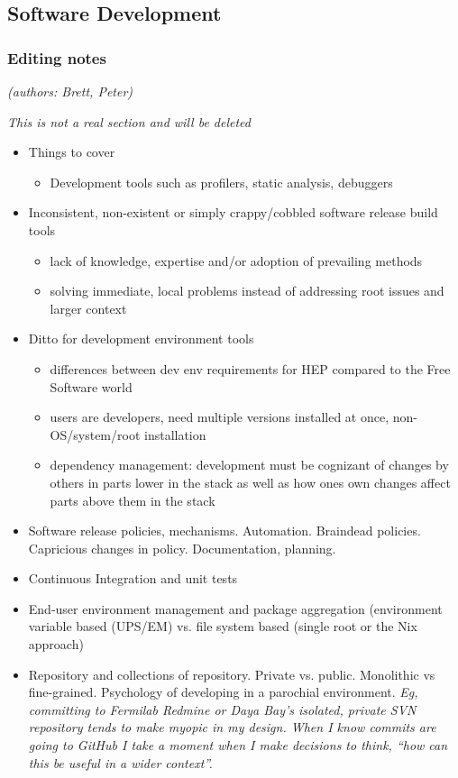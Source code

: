 \subsection{Software Development}

\subsubsection{Editing notes}

\textit{(authors: Brett, Peter)}

\textit{This is not a real section and will be deleted}

\begin{itemize}
\item Things to cover
  \begin{itemize}
  \item Development tools such as profilers, static analysis, debuggers
  \end{itemize}
\item Inconsistent, non-existent or simply crappy/cobbled software release build tools
  \begin{itemize}
  \item lack of knowledge, expertise and/or adoption of prevailing methods
  \item solving immediate, local problems instead of addressing root issues and larger context
  \end{itemize}
\item Ditto for development environment tools
  \begin{itemize}
  \item differences between dev env requirements for HEP compared to the Free Software world
  \item users are developers, need multiple versions installed at once, non-OS/system/root installation
  \item dependency management: development must be cognizant of changes by others in parts lower in the stack as well as how ones own changes affect parts above them in the stack
  \end{itemize}
\item Software release policies, mechanisms.  Automation.  Braindead policies.  Capricious changes in policy.  Documentation, planning.
\item Continuous Integration and unit tests
\item End-user environment management and package aggregation (environment variable based (UPS/EM) vs. file system based (single root or the Nix approach)
\item Repository and collections of repository.  Private vs. public.  Monolithic vs fine-grained.  Psychology of developing in a parochial environment.  \textit{Eg, committing to Fermilab Redmine or Daya Bay's  isolated, private SVN repository tends to make myopic in my design.  When I know commits are going to GitHub I take a moment when I make decisions to think, ``how can this be useful in a wider context''.}
\end{itemize}

